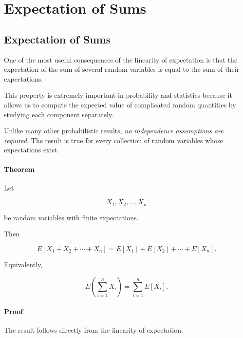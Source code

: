 \documentclass[11pt]{article}
\begin{document}
	\section{Expectation of Sums}
	\begin{mdframed}[
		linewidth=0.8pt,
		roundcorner=6pt,
		backgroundcolor=gray!5,
		linecolor=gray!60,
		innertopmargin=10pt,
		innerbottommargin=10pt,
		innerleftmargin=10pt,
		innerrightmargin=10pt
		]
		
		\subsection*{Expectation of Sums}
		
		One of the most useful consequences of the linearity of expectation is that
		the expectation of the sum of several random variables is equal to the sum
		of their expectations.
		
		This property is extremely important in probability and statistics because
		it allows us to compute the expected value of complicated random quantities
		by studying each component separately.
		
		Unlike many other probabilistic results, \emph{no independence assumptions
			are required}. The result is true for every collection of random variables
		whose expectations exist.
		
		\bigskip
		
		\paragraph{Theorem}
		
		Let
		
		\[
		X_1,X_2,\ldots,X_n
		\]
		
		be random variables with finite expectations.
		
		Then
		
		\[
		\boxed{
			E[X_1+X_2+\cdots+X_n]
			=
			E[X_1]+E[X_2]+\cdots+E[X_n].
		}
		\]
		
		Equivalently,
		
		\[
		\boxed{
			E\!\left(
			\sum_{i=1}^{n}X_i
			\right)
			=
			\sum_{i=1}^{n}E[X_i].
		}
		\]
		
		\bigskip
		
		\paragraph{Proof}
		
		The result follows directly from the linearity of expectation.
		

\end{mdframed}
\end{document}
